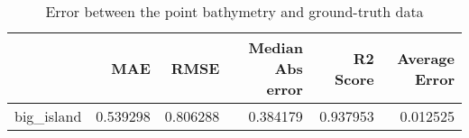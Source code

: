 \begin{table}[h!]
\caption{Error between the point bathymetry and ground-truth data}
\label{tab:big_island_lidar_error}
\begin{tabular}{lrrrrr}
\toprule
 & MAE & RMSE & Median Abs error & R2 Score & Average Error \\
\midrule
big_island & 0.539298 & 0.806288 & 0.384179 & 0.937953 & 0.012525 \\
\bottomrule
\end{tabular}
\end{table}
